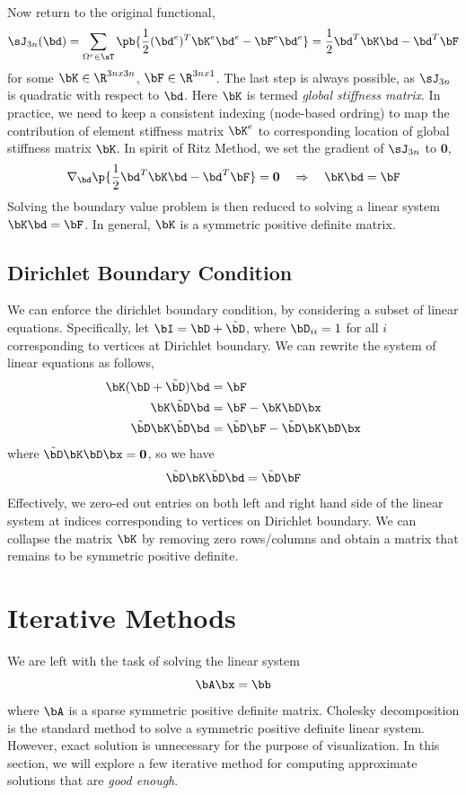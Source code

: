 \documentclass[11pt,titlepage]{article}
\begin{document}
Now return to the original functional,
\[
    \sJ_{3n}(\bd) = 
        \sum_{\Omega^e \in \sT} \pb{
            \frac{1}{2} (\bd^e)^T \bK^e \bd^e
                - \bF^e \bd^e
        }
        =
        \frac{1}{2} \bd^T \bK \bd - \bd^T \bF
\]
for some $\bK\in\R^{3nx3n}$, $\bF\in\R^{3nx1}$. The last step is always possible, as $\sJ_{3n}$ is quadratic with respect to $\bd$. Here $\bK$ is termed \textit{global stiffness matrix}. In practice, we need to keep a consistent indexing (node-based ordring) to map the contribution of element stiffness matrix $\bK^e$ to corresponding location of global stiffness matrix $\bK$. In spirit of Ritz Method, we set the gradient of $\sJ_{3n}$ to $\mathbf{0}$,
\[
    \nabla_{\bd} \p{\frac{1}{2} \bd^T \bK \bd - \bd^T \bF} = \mathbf{0}
    \quad\Rightarrow\quad
    \bK \bd = \bF
\]
Solving the boundary value problem is then reduced to solving a linear system $\bK \bd = \bF$. In general, $\bK$ is a symmetric positive definite matrix.

\subsection{Dirichlet Boundary Condition}

We can enforce the dirichlet boundary condition, by considering a subset of linear equations. Specifically, let $\bI = \bD + \tilde{\bD}$, where $\bD_{ii} = 1$ for all $i$ corresponding to vertices at Dirichlet boundary. We can rewrite the system of linear equations as follows,
\begin{align*}
    \bK(\bD + \tilde{\bD}) \bd 
        &= \bF \\
    \bK \tilde{\bD} \bd 
        &= \bF - \bK\bD \bx \\
    \tilde{\bD} \bK \tilde{\bD} \bd 
        &= \tilde{\bD} \bF - \tilde{\bD} \bK\bD \bx
\end{align*}
where $\tilde{\bD} \bK\bD \bx = \mathbf{0}$, so we have
\[
    \tilde{\bD} \bK \tilde{\bD}\bd
    = \tilde{\bD} \bF
\]
Effectively, we zero-ed out entries on both left and right hand side of the linear system at indices corresponding to vertices on Dirichlet boundary. We can collapse the matrix $\bK$ by removing zero rows/columns and obtain a matrix that remains to be symmetric positive definite.

\section{Iterative Methods} 

We are left with the task of solving the linear system
\[
    \bA\bx = \bb
\]
where $\bA$ is a sparse symmetric positive definite matrix. Cholesky decomposition is the standard method to solve a symmetric positive definite linear system. However, exact solution is unnecessary for the purpose of visualization. In this section, we will explore a few iterative method for computing approximate solutions that are \textit{good enough}.
\end{document}
